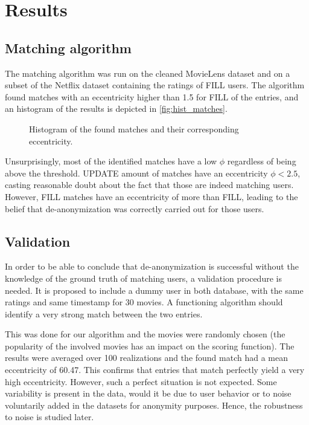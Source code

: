\section{Results}\label{sec:results}

\subsection{Matching algorithm}

The matching algorithm was run on the cleaned MovieLens dataset and on a subset of the Netflix dataset containing the ratings of FILL users. The algorithm found matches with an eccentricity higher than 1.5 for FILL of the entries, and an histogram of the results is depicted in \autoref{fig:hist_matches}.

\begin{figure}[h]
	\centering
	
	\caption{Histogram of the found matches and their corresponding eccentricity.}
	\label{fig:hist_matches}
\end{figure}

Unsurprisingly, most of the identified matches have a low $\phi$ regardless of being above the threshold. UPDATE amount of matches have an eccentricity $\phi < 2.5$, casting reasonable doubt about the fact that those are indeed matching users. However, FILL matches have an eccentricity of more than FILL, leading to the belief that de-anonymization was correctly carried out for those users.

\subsection{Validation}

In order to be able to conclude that de-anonymization is successful without the knowledge of the ground truth of matching users, a validation procedure is needed. It is proposed to include a dummy user in both database, with the same ratings and same timestamp for 30 movies. A functioning algorithm should identify a very strong match between the two entries.

This was done for our algorithm and the movies were randomly chosen (the popularity of the involved movies has an impact on the scoring function). The results were averaged over 100 realizations and the found match had a mean eccentricity of 60.47. This confirms that entries that match perfectly yield a very high eccentricity. However, such a perfect situation is not expected. Some variability is present in the data, would it be due to user behavior or to noise voluntarily added in the datasets for anonymity purposes. Hence, the robustness to noise is studied later.

